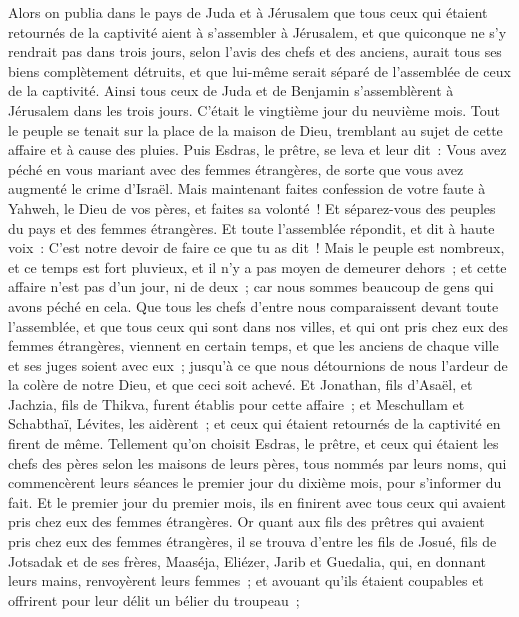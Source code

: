 \begin{multicols}{2}
Alors on publia dans le pays de Juda et à Jérusalem que tous ceux qui étaient retournés de la captivité aient à s'assembler à Jérusalem,
et que quiconque ne s'y rendrait pas dans trois jours, selon l'avis des chefs et des anciens, aurait tous ses biens complètement détruits, et que lui-même serait séparé de l'assemblée de ceux de la captivité.
Ainsi tous ceux de Juda et de Benjamin s'assemblèrent à Jérusalem dans les trois jours. C'était le vingtième jour du neuvième mois. Tout le peuple se tenait sur la place de la maison de Dieu, tremblant au sujet de cette affaire et à cause des pluies.
Puis Esdras, le prêtre, se leva et leur dit~: Vous avez péché en vous mariant avec des femmes étrangères, de sorte que vous avez augmenté le crime d'Israël.
Mais maintenant faites confession de votre faute à Yahweh, le Dieu de vos pères, et faites sa volonté~! Et séparez-vous des peuples du pays et des femmes étrangères.
Et toute l'assemblée répondit, et dit à haute voix~: C'est notre devoir de faire ce que tu as dit~!
Mais le peuple est nombreux, et ce temps est fort pluvieux, et il n'y a pas moyen de demeurer dehors~; et cette affaire n'est pas d'un jour, ni de deux~; car nous sommes beaucoup de gens qui avons péché en cela.
Que tous les chefs d'entre nous comparaissent devant toute l'assemblée, et que tous ceux qui sont dans nos villes, et qui ont pris chez eux des femmes étrangères, viennent en certain temps, et que les anciens de chaque ville et ses juges soient avec eux~; jusqu'à ce que nous détournions de nous l'ardeur de la colère de notre Dieu, et que ceci soit achevé.
Et Jonathan, fils d'Asaël, et Jachzia, fils de Thikva, furent établis pour cette affaire~; et Meschullam et Schabthaï, Lévites, les aidèrent~;
et ceux qui étaient retournés de la captivité en firent de même. Tellement qu'on choisit Esdras, le prêtre, et ceux qui étaient les chefs des pères selon les maisons de leurs pères, tous nommés par leurs noms, qui commencèrent leurs séances le premier jour du dixième mois, pour s'informer du fait.
Et le premier jour du premier mois, ils en finirent avec tous ceux qui avaient pris chez eux des femmes étrangères.
Or quant aux fils des prêtres qui avaient pris chez eux des femmes étrangères, il se trouva d'entre les fils de Josué, fils de Jotsadak et de ses frères, Maaséja, Eliézer, Jarib et Guedalia,
qui, en donnant leurs mains, renvoyèrent leurs femmes~; et avouant qu'ils étaient coupables et offrirent pour leur délit un bélier du troupeau~;

\end{multicols}
